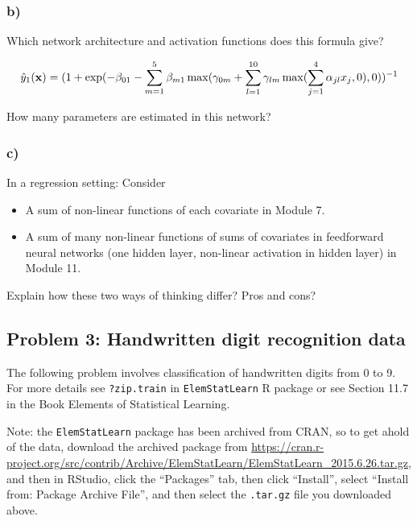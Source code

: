 \documentclass[]{article}
\providecommand{\tightlist}{%
  \setlength{\itemsep}{0pt}\setlength{\parskip}{0pt}}
\begin{document}
\hypertarget{b-1}{%
\subsubsection{b)}\label{b-1}}

Which network architecture and activation functions does this formula
give?

\[ \hat{y}_1({\bf x})=(1+\exp(-\beta_{01}-\sum_{m=1}^5 \beta_{m1}\max(\gamma_{0m}+\sum_{l=1}^{10} \gamma_{lm}\max(\sum_{j=1}^{4}\alpha_{jl}x_j,0),0))^{-1}\]

How many parameters are estimated in this network?

\hypertarget{c-1}{%
\subsubsection{c)}\label{c-1}}

In a regression setting: Consider

\begin{itemize}
\tightlist
\item
  A sum of non-linear functions of each covariate in Module 7.
\item
  A sum of many non-linear functions of sums of covariates in
  feedforward neural networks (one hidden layer, non-linear activation
  in hidden layer) in Module 11.
\end{itemize}

Explain how these two ways of thinking differ? Pros and cons?

\hypertarget{problem-3-handwritten-digit-recognition-data}{%
\subsection{Problem 3: Handwritten digit recognition
data}\label{problem-3-handwritten-digit-recognition-data}}

The following problem involves classification of handwritten digits from
0 to 9. For more details see \texttt{?zip.train} in
\texttt{ElemStatLearn} R package or see Section 11.7 in the Book
Elements of Statistical Learning.

Note: the \texttt{ElemStatLearn} package has been archived from CRAN, so
to get ahold of the data, download the archived package from
\url{https://cran.r-project.org/src/contrib/Archive/ElemStatLearn/ElemStatLearn_2015.6.26.tar.gz},
and then in RStudio, click the ``Packages'' tab, then click ``Install'',
select ``Install from: Package Archive File'', and then select the
\texttt{.tar.gz} file you downloaded above.
\end{document}
